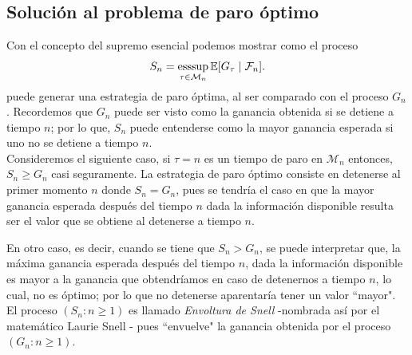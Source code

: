 \subsection{Solución al problema de paro óptimo}
Con el concepto del supremo esencial podemos mostrar como el proceso
	\begin{align}
	S_n = \operatorname*{esssup}_{\tau \in \mathcal{M}_n} \mathbb{E}[G_\tau \mid \mathcal{F}_n] \label{snell}.
	\end{align}
puede generar una estrategia de paro óptima, al ser comparado con el proceso $G_n$. Recordemos que $G_n$ puede ser visto como la ganancia obtenida si se detiene a tiempo $n$; por lo que, $S_n$ puede entenderse como la mayor ganancia esperada si uno no se detiene a tiempo $n$. \\

Consideremos el siguiente caso, si $\tau = n$ es un tiempo de paro en $\mathcal{M}_n$ entonces, $S_n \geq G_n$ casi seguramente. La estrategia de paro óptimo consiste en detenerse al primer momento $n$ donde $S_n = G_n$, pues se tendría el caso en que la mayor ganancia esperada después del tiempo $n$ dada la información disponible resulta ser el valor que se obtiene al detenerse a tiempo $n$. 

En otro caso, es decir, cuando se tiene que $S_n > G_n$, se puede interpretar que, la máxima ganancia esperada después del tiempo $n$, dada la información disponible es mayor a la ganancia que obtendríamos en caso de detenernos a tiempo $n$, lo cual, no es óptimo; por lo que no detenerse aparentaría tener un valor ``mayor". \\

El proceso $(S_n : n \geq 1)$ es llamado \emph{Envoltura de Snell} -nombrada así por el matemático Laurie Snell \cite[p.~4]{kyprianou}- pues ``envuelve"  la ganancia obtenida por el proceso $(G_n : n \geq 1)$.


